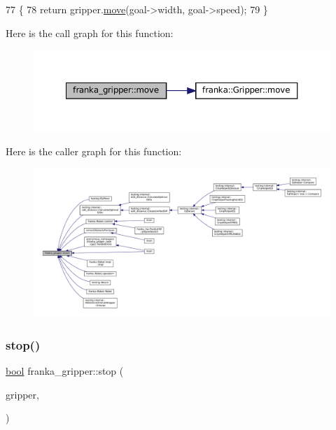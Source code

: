 \begin{DoxyCode}
77                                                                       \{
78   \textcolor{keywordflow}{return} gripper.\hyperlink{classfranka_1_1Gripper_a047bc39267d66d6fb26c4c70669d68c2}{move}(goal->width, goal->speed);
79 \}
\end{DoxyCode}
Here is the call graph for this function\+:
\nopagebreak
\begin{figure}[H]
\begin{center}
\leavevmode
\includegraphics[width=350pt]{namespacefranka__gripper_a1356a87108d2229401d3755bd3e53bdf_cgraph}
\end{center}
\end{figure}
Here is the caller graph for this function\+:
\nopagebreak
\begin{figure}[H]
\begin{center}
\leavevmode
\includegraphics[width=350pt]{namespacefranka__gripper_a1356a87108d2229401d3755bd3e53bdf_icgraph}
\end{center}
\end{figure}
\mbox{\label{namespacefranka__gripper_a4030b4a443c096b625233396f4314a04}} 
\subsubsection{\texorpdfstring{stop()}{stop()}}
{\footnotesize\ttfamily \hyperlink{classbool}{bool} franka\+\_\+gripper\+::stop (\begin{DoxyParamCaption}\item[{const \hyperlink{classfranka_1_1Gripper}{franka\+::\+Gripper} \&}]{gripper,  }\item[{const Stop\+Goal\+Const\+Ptr \&}]{ }\end{DoxyParamCaption})}

